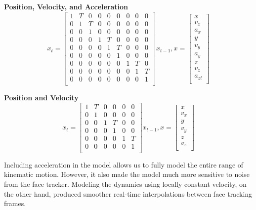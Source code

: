 \documentclass[10pt,twocolumn,letterpaper]{article}
\begin{document}
\textbf{Position, Velocity, and Acceleration}
$$ x_t =\begin{bmatrix}
  1 & T & 0 & 0 & 0 & 0 & 0 & 0 & 0 \\
  0 & 1 & T & 0 & 0 & 0 & 0 & 0 & 0 \\
  0 & 0 & 1 & 0 & 0 & 0 & 0 & 0 & 0 \\
  0 & 0 & 0 & 1 & T & 0 & 0 & 0 & 0 \\
  0 & 0 & 0 & 0 & 1 & T & 0 & 0 & 0 \\
  0 & 0 & 0 & 0 & 0 & 1 & 0 & 0 & 0 \\
  0 & 0 & 0 & 0 & 0 & 0 & 1 & T & 0 \\
  0 & 0 & 0 & 0 & 0 & 0 & 0 & 1 & T \\
  0 & 0 & 0 & 0 & 0 & 0 & 0 & 0 & 1 \\
\end{bmatrix} x_{t-1},
x =
\begin{bmatrix}
  x \\
  v_{x} \\
  a_{x} \\
  y \\
  v_{y} \\
  a_{y} \\
  z \\
  v_{z} \\
  a_{zt} \\
\end{bmatrix}$$

\textbf{Position and Velocity}
$$ x_t =\begin{bmatrix}
  1 & T & 0 & 0 & 0 & 0 \\
  0 & 1 & 0 & 0 & 0 & 0 \\
  0 & 0 & 1 & T & 0 & 0 \\
  0 & 0 & 0 & 1 & 0 & 0 \\
  0 & 0 & 0 & 0 & 1 & T \\
  0 & 0 & 0 & 0 & 0 & 1 \\
\end{bmatrix} x_{t-1},
x =
\begin{bmatrix}
  x \\
  v_{x} \\
  y \\
  v_{y} \\
  z \\
  v_{z} \\
\end{bmatrix}$$

Including acceleration in the model allows us to fully model the entire range of kinematic motion. However, it also made the model much more sensitive to noise from the face tracker. Modeling the dynamics using locally constant velocity, on the other hand, produced smoother real-time interpolations between face tracking frames. 
\end{document}
